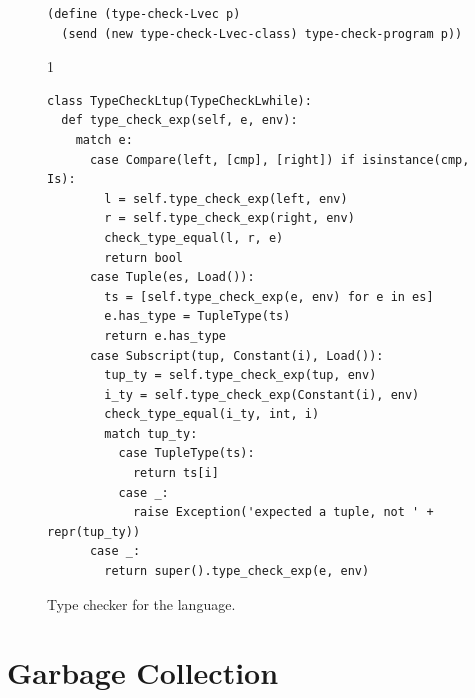 \documentclass[7x10]{TimesAPriori_MIT}%
\def\pythonEd{1}
\providecommand{\BookEdition}{1}
\let\edition\BookEdition
\newcommand{\pythonColor}[0]{}
\numberwithin{theorem}{chapter}
\numberwithin{definition}{chapter}
\numberwithin{equation}{chapter}
\begin{document}
\begin{figure}[tp]
\begin{tcolorbox}[colback=white]
{\begin{lstlisting}[basicstyle=\ttfamily\footnotesize]
(define (type-check-Lvec p)
  (send (new type-check-Lvec-class) type-check-program p))
\end{lstlisting}
\fi}
{\if\edition\pythonEd\pythonColor
\begin{lstlisting}
class TypeCheckLtup(TypeCheckLwhile):
  def type_check_exp(self, e, env):
    match e:
      case Compare(left, [cmp], [right]) if isinstance(cmp, Is):
        l = self.type_check_exp(left, env)
        r = self.type_check_exp(right, env)
        check_type_equal(l, r, e)
        return bool
      case Tuple(es, Load()):
        ts = [self.type_check_exp(e, env) for e in es]
        e.has_type = TupleType(ts)
        return e.has_type
      case Subscript(tup, Constant(i), Load()):
        tup_ty = self.type_check_exp(tup, env)
        i_ty = self.type_check_exp(Constant(i), env)
        check_type_equal(i_ty, int, i)
        match tup_ty:
          case TupleType(ts):
            return ts[i]
          case _:
            raise Exception('expected a tuple, not ' + repr(tup_ty))
      case _:
        return super().type_check_exp(e, env)
\end{lstlisting}
\fi}
  \end{tcolorbox}

  \caption{Type checker for the \LangVec{} language.}
\label{fig:type-check-Lvec}
\end{figure}


\section{Garbage Collection}
\label{sec:GC}
\end{document}
